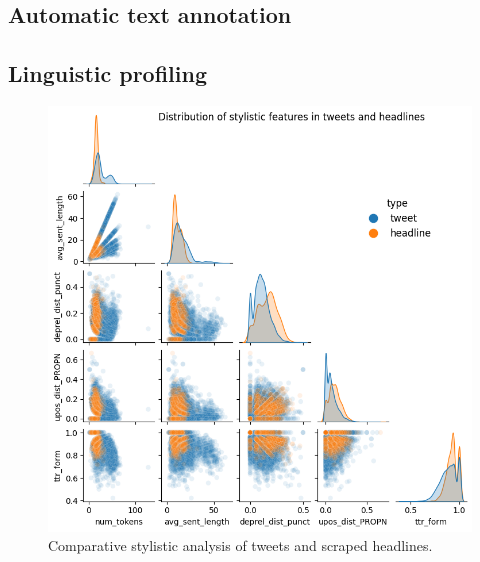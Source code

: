 \subsection{Automatic text annotation}
\cite{stanza}
\subsection{Linguistic profiling}
\begin{figure}
    \includegraphics[width=\columnwidth]{../../results/images/style.png}
    \caption{Comparative stylistic analysis of tweets and scraped headlines.}
\end{figure}